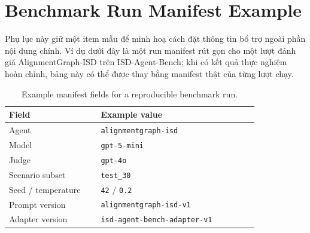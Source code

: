 \documentclass[../main.tex]{subfiles}
\begin{document}
\section{Benchmark Run Manifest Example}

Phụ lục này giữ một item mẫu để minh hoạ cách đặt thông tin bổ trợ ngoài phần nội dung chính. Ví dụ dưới đây là một run manifest rút gọn cho một lượt đánh giá AlignmentGraph-ISD trên ISD-Agent-Bench; khi có kết quả thực nghiệm hoàn chỉnh, bảng này có thể được thay bằng manifest thật của từng lượt chạy.

\begin{table}[H]
\centering
\caption{Example manifest fields for a reproducible benchmark run.}
\label{tab:appendix-manifest-example}
\begin{tabular}{|p{0.32\linewidth}|p{0.55\linewidth}|}
\hline
\textbf{Field} & \textbf{Example value} \\
\hline
Agent & \texttt{alignmentgraph-isd} \\
\hline
Model & \texttt{gpt-5-mini} \\
\hline
Judge & \texttt{gpt-4o} \\
\hline
Scenario subset & \texttt{test\_30} \\
\hline
Seed / temperature & \texttt{42} / \texttt{0.2} \\
\hline
Prompt version & \texttt{alignmentgraph-isd-v1} \\
\hline
Adapter version & \texttt{isd-agent-bench-adapter-v1} \\
\hline
\end{tabular}
\end{table}
\end{document}
